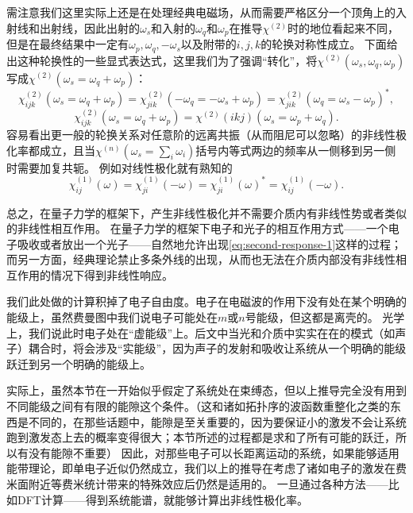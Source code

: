 需注意我们这里实际上还是在处理经典电磁场，从而需要严格区分一个顶角上的入射线和出射线，因此出射的$\omega_s$和入射的$\omega_q$和$\omega_p$在推导$\chi^{(2)}$时的地位看起来不同，但是在最终结果中一定有$\omega_p, \omega_q, -\omega_s$以及附带的$i, j, k$的轮换对称性成立。
下面给出这种轮换性的一些显式表达式，这里我们为了强调“转化”，将$\chi^{(2)}(\omega_s, \omega_q, \omega_p)$写成$\chi^{(2)}(\omega_s = \omega_q + \omega_p)$：
\begin{equation}
    \chi^{(2)}_{ijk}(\omega_s = \omega_q + \omega_p) = \chi^{(2)}_{jik}(- \omega_q = - \omega_s + \omega_p) = \chi^{(2)}_{jik}(\omega_q = \omega_s - \omega_p)^*, 
\end{equation}
\begin{equation}
    \chi^{(2)}_{ijk}(\omega_s = \omega_q + \omega_p) = \chi^{(2)}(ikj)(\omega_s = \omega_p + \omega_q).
\end{equation}
容易看出更一般的轮换关系对任意阶的远离共振（从而阻尼可以忽略）的非线性极化率都成立，且当$\chi^{(n)}(\omega_s = \sum_i \omega_i)$括号内等式两边的频率从一侧移到另一侧时需要加复共轭。
例如对线性极化就有熟知的
\begin{equation}
    \chi^{(1)}_{ij}(\omega) = \chi^{(1)}_{ji}(-\omega) = \chi^{(1)}_{ji}(\omega)^* = \chi^{(1)}_{ij}(-\omega).
\end{equation}

总之，在量子力学的框架下，产生非线性极化并不需要介质内有非线性势或者类似的非线性相互作用。
在量子力学的框架下电子和光子的相互作用方式——一个电子吸收或者放出一个光子——自然地允许出现\eqref{eq:second-response-1}这样的过程；而另一方面，经典理论禁止多条外线的出现，从而也无法在介质内部没有非线性相互作用的情况下得到非线性响应。

我们此处做的计算积掉了电子自由度。电子在电磁波的作用下没有处在某个明确的能级上，虽然费曼图中我们说电子可能处在$m$或$n$号能级，但这都是离壳的。
光学上，我们说此时电子处在“虚能级”上。后文中当光和介质中实实在在的模式（如声子）耦合时，将会涉及“实能级”，因为声子的发射和吸收让系统从一个明确的能级跃迁到另一个明确的能级上。

实际上，虽然本节在一开始似乎假定了系统处在束缚态，但以上推导完全没有用到不同能级之间有有限的能隙这个条件。（这和诸如拓扑序的波函数重整化之类的东西是不同的，在那些话题中，能隙是至关重要的，因为要保证小的激发不会让系统跑到激发态上去的概率变得很大；本节所述的过程都是求和了所有可能的跃迁，所以有没有能隙不重要）
因此，对那些电子可以长距离运动的系统，如果能够适用能带理论，即单电子近似仍然成立，我们以上的推导在考虑了诸如电子的激发在费米面附近等费米统计带来的特殊效应后仍然是适用的。
一旦通过各种方法——比如DFT计算——得到系统能谱，就能够计算出非线性极化率。

